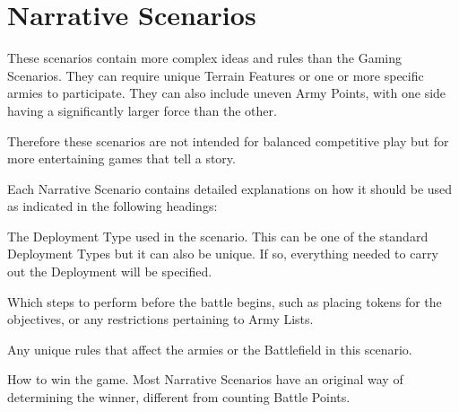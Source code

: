 
\part*{Narrative Scenarios}
\label{narrative_scenarios}

These scenarios contain more complex ideas and rules than the Gaming Scenarios. They can require unique Terrain Features or one or more specific armies to participate. They can also include uneven Army Points, with one side having a significantly larger force than the other.

Therefore these scenarios are not intended for balanced competitive play but for more entertaining games that tell a story.

Each Narrative Scenario contains detailed explanations on how it should be used as indicated in the following headings:

\startgamingscenarioheadings%
 The Deployment Type used in the scenario. This can be one of the standard Deployment Types but it can also be unique. If so, everything needed to carry out the Deployment will be specified.

 Which steps to perform before the battle begins, such as placing tokens for the objectives, or any restrictions pertaining to Army Lists.

 Any unique rules that affect the armies or the Battlefield in this scenario.

 How to win the game. Most Narrative Scenarios have an original way of determining the winner, different from counting Battle Points.
\closegamingscenarioheadings%

